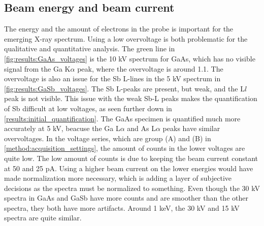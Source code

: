 




\subsection{Beam energy and beam current}
\label{results:beam_energy_and_beam_current}


The energy and the amount of electrons in the probe is important for the emerging X-ray spectrum.
Using a low overvoltage is both problematic for the qualitative and quantitative analysis.
The green line in \cref{fig:results:GaAs_voltages} is the 10 kV spectrum for GaAs, which has no visible signal from the Ga K$\alpha$ peak, where the overvoltage is around 1.1.
The overvoltage is also an issue for the Sb L-lines in the 5 kV spectrum in \cref{fig:results:GaSb_voltages}.
The Sb L-peaks are present, but weak, and the L$l$ peak is not visible.
This issue with the weak Sb-L peaks makes the quantification of Sb difficult at low voltages, as seen further down in \cref{results:initial_quantification}.
The GaAs specimen is quantified much more accurately at 5 kV, beacuse the Ga L$\alpha$ and As L$\alpha$ peaks have similar overvoltages.
In the voltage series, which are group (A) and (B) in \cref{method:acquisition_settings}, the amount of counts in the lower voltages are quite low.
The low amount of counts is due to keeping the beam current constant at 50 and 25 pA.
Using a higher beam current on the lower energies would have made normalization more necessary, which is adding a layer of subjective decisions as the spectra must be normalized to something.
Even though the 30 kV spectra in GaAs and GaSb have more counts and are smoother than the other spectra, they both have more artifacts.
Around 1 keV, the 30 kV and 15 kV spectra are quite similar.


